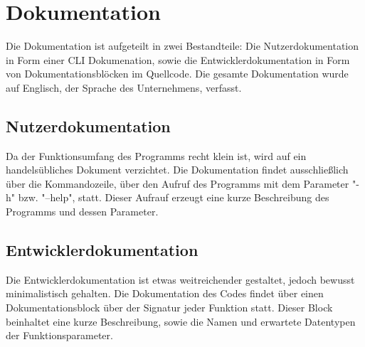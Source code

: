 \section{Dokumentation}
Die Dokumentation ist aufgeteilt in zwei Bestandteile: Die Nutzerdokumentation
in Form einer CLI Dokumenation, sowie die Entwicklerdokumentation in Form von
Dokumentationsblöcken im Quellcode. Die gesamte Dokumentation wurde auf Englisch,
der Sprache des Unternehmens, verfasst.

\subsection{Nutzerdokumentation}
Da der Funktionsumfang des Programms recht klein ist, wird auf ein handelsübliches
Dokument verzichtet. Die Dokumentation findet ausschließlich über die Kommandozeile, über den Aufruf des Programms mit dem Parameter "-h" bzw. "--help", statt.
Dieser Aufrauf erzeugt eine kurze Beschreibung des Programms und dessen Parameter.

\subsection{Entwicklerdokumentation}
Die Entwicklerdokumentation ist etwas weitreichender gestaltet, jedoch bewusst minimalistisch gehalten. Die Dokumentation des Codes findet über einen
Dokumentationsblock über der Signatur jeder Funktion statt. Dieser Block beinhaltet
eine kurze Beschreibung, sowie die Namen und erwartete Datentypen der Funktionsparameter.
